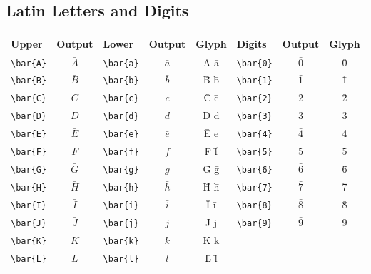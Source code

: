 \documentclass[12pt,a4paper]{article}
\begin{document}
\subsection*{Latin Letters and Digits}
\begin{longtable}{|l|c|l|c|c|l|c|c|}
\hline
\textbf{Upper}     & \textbf{Output} & \textbf{Lower}     & \textbf{Output} & \textbf{Glyph} & \textbf{Digits} & \textbf{Output} & \textbf{Glyph} \\
\hline
\verb|\bar{A}|     & $\bar{A}$       & \verb|\bar{a}|     & $\bar{a}$       & Ā ā            & \verb|\bar{0}|  & $\bar{0}$       & 0̄ \\
\verb|\bar{B}|     & $\bar{B}$       & \verb|\bar{b}|     & $\bar{b}$       & B̄ b̄            & \verb|\bar{1}|  & $\bar{1}$       & 1̄ \\
\verb|\bar{C}|     & $\bar{C}$       & \verb|\bar{c}|     & $\bar{c}$       & C̄ c̄            & \verb|\bar{2}|  & $\bar{2}$       & 2̄ \\
\verb|\bar{D}|     & $\bar{D}$       & \verb|\bar{d}|     & $\bar{d}$       & D̄ d̄            & \verb|\bar{3}|  & $\bar{3}$       & 3̄ \\
\verb|\bar{E}|     & $\bar{E}$       & \verb|\bar{e}|     & $\bar{e}$       & Ē ē            & \verb|\bar{4}|  & $\bar{4}$       & 4̄ \\
\verb|\bar{F}|     & $\bar{F}$       & \verb|\bar{f}|     & $\bar{f}$       & F̄ f̄            & \verb|\bar{5}|  & $\bar{5}$       & 5̄ \\
\verb|\bar{G}|     & $\bar{G}$       & \verb|\bar{g}|     & $\bar{g}$       & Ḡ ḡ            & \verb|\bar{6}|  & $\bar{6}$       & 6̄ \\
\verb|\bar{H}|     & $\bar{H}$       & \verb|\bar{h}|     & $\bar{h}$       & H̄ h̄            & \verb|\bar{7}|  & $\bar{7}$       & 7̄ \\
\verb|\bar{I}|     & $\bar{I}$       & \verb|\bar{i}|     & $\bar{i}$       & Ī ī            & \verb|\bar{8}|  & $\bar{8}$       & 8̄ \\
\verb|\bar{J}|     & $\bar{J}$       & \verb|\bar{j}|     & $\bar{j}$       & J̄ j̄            & \verb|\bar{9}|  & $\bar{9}$       & 9̄ \\
\verb|\bar{K}|     & $\bar{K}$       & \verb|\bar{k}|     & $\bar{k}$       & K̄ k̄            &                 &                 & \\
\verb|\bar{L}|     & $\bar{L}$       & \verb|\bar{l}|     & $\bar{l}$       & L̄ l̄            &                 &                 & \\

\end{longtable}
\end{document}
